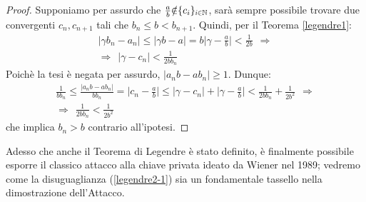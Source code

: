 \documentclass[twoside,symmetric,justified,openany,nobib]{tufte-book}
\begin{document}
\begin{proof}
  Supponiamo per assurdo che $\frac{a}{b}{\notin}\{ c_i \}_{\scalebox{.7}{$i{\in}\mathbb{N}$}}$, sarà sempre possibile trovare due convergenti $c_n,c_{n+1}$ tali che $b_n{\leq}b{<}b_{n+1}$. Quindi, per il Teorema \ref{legendre1}:
  \[
    \begin{array}{c}
      |\gamma b_n{-}a_n| \leq |\gamma b{-}a| = b\bigl|\gamma {-}\frac{a}{b}\bigr| < \frac{1}{2b}\hspace{5pt} \Rightarrow\\
      \Rightarrow\hspace{5pt} |\gamma {-}c_n|<\frac{1}{2bb_n}
    \end{array}
  \]
  Poichè la tesi è negata per assurdo, $|a_nb{-}ab_n|{\geq}1$. Dunque:
  \[
    \begin{array}{c}
      \frac{1}{bb_n} \leq \frac{|a_nb{-}ab_n|}{bb_n} = \bigl|c_n{-}\frac{a}{b}\bigr| \leq |\gamma{-}c_n|{+}\bigl|\gamma{-}\frac{a}{b}\bigr| < \frac{1}{2bb_n}{+}\frac{1}{2b^2}\hspace{5pt} \Rightarrow\\
      \Rightarrow\hspace{5pt} \frac{1}{2bb_n} < \frac{1}{2b^2}
    \end{array}
  \]
  che implica $b_n{>}b$ contrario all'ipotesi.
\end{proof}

\noindent
Adesso che anche il Teorema di Legendre è stato definito, è finalmente possibile esporre il classico attacco alla chiave privata ideato da Wiener nel 1989; vedremo come la disuguaglianza (\ref{legendre2-1}) sia un fondamentale tassello nella dimostrazione dell'Attacco.
\end{document}
